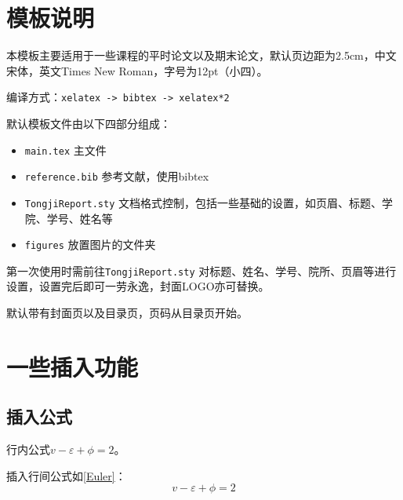 \documentclass[12pt,hyperref,a4paper,UTF8]{ctexart}
\begin{document}
\cover

%
%

\thispagestyle{empty} %

\newpage
\tableofcontents

\newpage


\section{模板说明}
本模板主要适用于一些课程的平时论文以及期末论文，默认页边距为2.5cm，中文宋体，英文Times New Roman，字号为12pt（小四）。

编译方式：\verb|xelatex -> bibtex -> xelatex*2|


默认模板文件由以下四部分组成：
\begin{itemize}
    \item \texttt{main.tex} 主文件
    \item \texttt{reference.bib} 参考文献，使用bibtex
    \item \texttt{TongjiReport.sty} 文档格式控制，包括一些基础的设置，如页眉、标题、学院、学号、姓名等
    \item \texttt{figures} 放置图片的文件夹
\end{itemize}

第一次使用时需前往\texttt{TongjiReport.sty} 对标题、姓名、学号、院所、页眉等进行设置，设置完后即可一劳永逸，封面LOGO亦可替换。

默认带有封面页以及目录页，页码从目录页开始。

\section{一些插入功能}
\subsection{插入公式}
行内公式$v-\varepsilon+\phi=2$。

插入行间公式如\autoref{Euler}：
\begin{equation}
    v-\varepsilon+\phi=2
    \label{Euler}
\end{equation}
\end{document}
